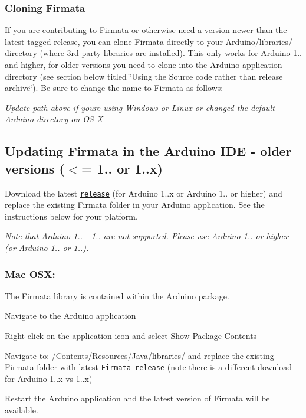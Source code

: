\subsubsection*{Cloning Firmata}

If you are contributing to Firmata or otherwise need a version newer than the latest tagged release, you can clone Firmata directly to your Arduino/libraries/ directory (where 3rd party libraries are installed). This only works for Arduino 1.. and higher, for older versions you need to clone into the Arduino application directory (see section below titled \char`\"{}\+Using the Source code rather than release archive\char`\"{}). Be sure to change the name to Firmata as follows\+:




{\itshape Update path above if you\textquotesingle{}re using Windows or Linux or changed the default Arduino directory on OS X}

\subsection*{Updating Firmata in the Arduino I\+DE -\/ older versions ($<$= 1.. or 1..\+x)}

Download the latest \href{https://github.com/firmata/arduino/releases/tag/2.5.4}{\tt release} (for Arduino 1..\+x or Arduino 1.. or higher) and replace the existing Firmata folder in your Arduino application. See the instructions below for your platform.

{\itshape Note that Arduino 1.. -\/ 1.. are not supported. Please use Arduino 1.. or higher (or Arduino 1.. or 1..).}

\subsubsection*{Mac O\+SX\+:}

The Firmata library is contained within the Arduino package.


\begin{DoxyEnumerate}
\item Navigate to the Arduino application
\item Right click on the application icon and select {\ttfamily Show Package Contents}
\item Navigate to\+: {\ttfamily /\+Contents/\+Resources/\+Java/libraries/} and replace the existing {\ttfamily Firmata} folder with latest \href{https://github.com/firmata/arduino/releases/tag/2.5.4}{\tt Firmata release} (note there is a different download for Arduino 1..\+x vs 1..\+x)
\item Restart the Arduino application and the latest version of Firmata will be available.
\end{DoxyEnumerate}

